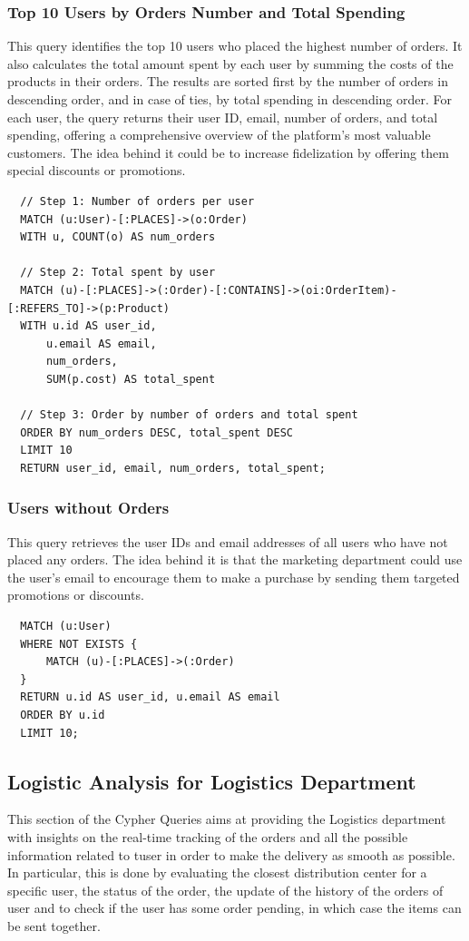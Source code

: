 \documentclass[a4paper,12pt]{article}
\begin{document}
\subsubsection{Top 10 Users by Orders Number and Total Spending}
This query identifies the top 10 users who placed the highest number of orders. It also calculates the total amount spent by each user by summing the costs of the products in their orders. The results are sorted first by the number of orders in descending order, and in case of ties, by total spending in descending order. For each user, the query returns their user ID, email, number of orders, and total spending, offering a comprehensive overview of the platform's most valuable customers.
The idea behind it could be to increase fidelization by offering them special discounts or promotions.
\begin{verbatim}
  // Step 1: Number of orders per user
  MATCH (u:User)-[:PLACES]->(o:Order)
  WITH u, COUNT(o) AS num_orders

  // Step 2: Total spent by user
  MATCH (u)-[:PLACES]->(:Order)-[:CONTAINS]->(oi:OrderItem)-[:REFERS_TO]->(p:Product)
  WITH u.id AS user_id, 
      u.email AS email, 
      num_orders, 
      SUM(p.cost) AS total_spent

  // Step 3: Order by number of orders and total spent
  ORDER BY num_orders DESC, total_spent DESC
  LIMIT 10
  RETURN user_id, email, num_orders, total_spent;
\end{verbatim}

\subsubsection{Users without Orders}
This query retrieves the user IDs and email addresses of all users who have not placed any orders. The idea behind it is that the marketing department could use the user's email to encourage them to make a purchase by sending them targeted promotions or discounts.
\begin{verbatim}
  MATCH (u:User)
  WHERE NOT EXISTS {
      MATCH (u)-[:PLACES]->(:Order)
  }
  RETURN u.id AS user_id, u.email AS email
  ORDER BY u.id
  LIMIT 10;
\end{verbatim}


\subsection{Logistic Analysis for Logistics Department}
This section of the Cypher Queries aims at providing the Logistics department with insights on the real-time tracking of the orders and all the possible information related to tuser in order to make the delivery as smooth as possible.
In particular, this is done by evaluating the closest distribution center for a specific user, the status of the order, the update of the history of the orders of user and to check if the user has some order pending, in which case the items can be sent together. 
\end{document}
